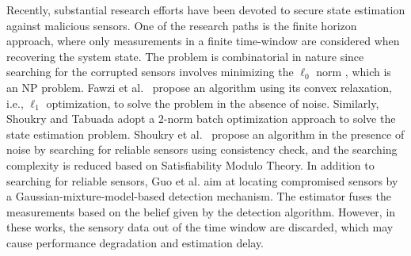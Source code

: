 \documentclass{ieeetrans}   %
\begin{document}





Recently, substantial research efforts have been devoted to secure state estimation against malicious sensors.
One of the research paths is the finite horizon approach, where only measurements in a finite time-window are considered when recovering the system state. 
The problem is combinatorial in nature since searching for the corrupted sensors involves minimizing the $\ell_0$ norm \cite{FawziTAC2014}, which is an NP problem.
Fawzi et al.~\cite{FawziTAC2014} propose an algorithm using its convex relaxation, i.e., $\ell_1$ optimization, to solve the problem in the absence of noise. 
Similarly, Shoukry and Tabuada \cite{ShoukryTAC2016} adopt a $2$-norm batch optimization approach to solve the state estimation problem.
Shoukry et al.~\cite{Shoukry2017} propose an algorithm in the presence of noise by searching for reliable sensors using consistency check, and the searching complexity is reduced based on Satisfiability Modulo Theory.
In addition to searching for reliable sensors, Guo et al. \cite{guoTSP2019} aim at locating compromised sensors by a Gaussian-mixture-model-based detection mechanism. The estimator fuses the measurements based on the belief given by the detection algorithm. 
However, in these works, the sensory data out of the time window are discarded, which may cause performance degradation and estimation delay.
\end{document}
